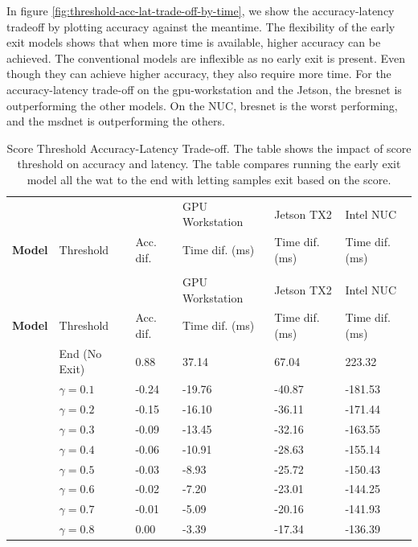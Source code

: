 In figure \ref{fig:threshold-acc-lat-trade-off-by-time}, we show the accuracy-latency tradeoff by plotting accuracy against the meantime.
The flexibility of the early exit models shows that when more time is available, higher accuracy can be achieved. The conventional models are inflexible as no early exit is present. Even though they can achieve higher accuracy, they also require more time.
For the accuracy-latency trade-off on the \gls{gpu}-workstation and the Jetson, the \gls{bresnet} is outperforming the other models. On the NUC, \gls{bresnet} is the worst performing, and the \gls{msdnet} is outperforming the others. 

	\begin{scriptsize}
		
		\begin{longtabu}{>{\bfseries}X|X|X[r]|X[r]|X[r]|X[r]}
			\caption[Score Threshold Accuracy-Latency Trade-off]{Score Threshold Accuracy-Latency Trade-off. The table shows the impact of score threshold on accuracy and latency. The table compares running the early exit model all the wat to the end with letting samples exit based on the score.}\label{tbl:score-acc-lat-trade} \\
			\toprule
			\rowfont{\bfseries}
			& & & {GPU Workstation} &  {Jetson TX2} & {Intel NUC} \tabularnewline
			\rowfont{\bfseries} Model & Threshold & Acc. dif. & Time dif. (ms)  & Time dif. (ms) & Time dif. (ms) \tabularnewline
			\hline
			\endfirsthead
			\\
			\toprule
			\rowfont{\bfseries}
			& &  & {GPU Workstation} &  {Jetson TX2} & {Intel NUC} \tabularnewline
			\rowfont{\bfseries} Model & Threshold & Acc. dif. & Time dif. (ms)  & Time dif. (ms) & Time dif. (ms) \tabularnewline
			\hline
			\endhead %
			\hline
			 & End (No Exit) & 0.88 & 37.14 & 67.04 & 223.32  \tabularnewline {}
			& $ \gamma = 0.1 $ 	& -0.24 & -19.76 & -40.87 & -181.53 \tabularnewline
			&$ \gamma = 0.2 $ 	& -0.15 & -16.10 & -36.11 & -171.44 \tabularnewline 
			&$ \gamma = 0.3 $ 	& -0.09 & -13.45 & -32.16 & -163.55 \tabularnewline
			&$ \gamma = 0.4 $ 	& -0.06 & -10.91 & -28.63 & -155.14 \tabularnewline 
			&$ \gamma = 0.5 $ 	& -0.03 &  -8.93 & -25.72 & -150.43 \tabularnewline
			&$ \gamma = 0.6 $ 	& -0.02 &  -7.20 & -23.01 & -144.25 \tabularnewline 
			&$ \gamma = 0.7 $ 	& -0.01 &  -5.09 & -20.16 & -141.93 \tabularnewline 
			&$ \gamma = 0.8 $ 	&  0.00 &  -3.39 & -17.34 & -136.39 \tabularnewline 

\end{longtabu}
\end{scriptsize}
